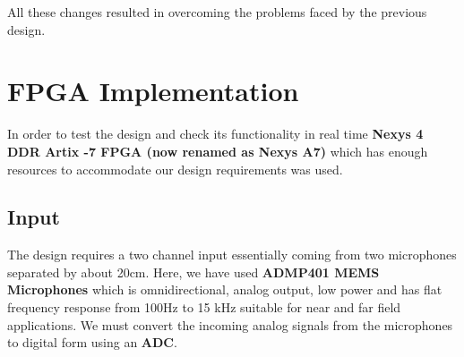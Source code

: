 \documentclass[BTech]{nitkdiss}
\begin{document}
All these changes resulted in overcoming the problems faced by the previous design. 

\section{FPGA Implementation}
In order to test the design and check its functionality in real time \textbf{Nexys 4 DDR Artix -7 FPGA (now renamed as Nexys A7)} which has enough resources to accommodate our design requirements was used.

\subsection{Input}
The design requires a two channel input essentially coming from two microphones separated by about 20cm. Here, we have used \textbf{ADMP401 MEMS Microphones} which is omnidirectional, analog output, low power and has flat frequency response from 100Hz to 15 kHz suitable for near and far field applications. We must convert the incoming analog signals from the microphones to digital form using an \textbf{ADC}.
\end{document}
